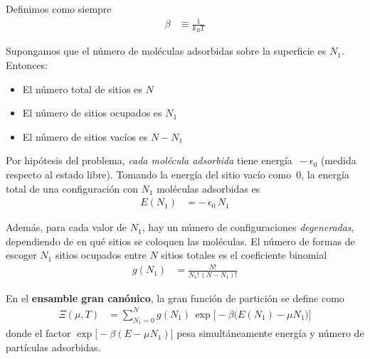 \documentclass{article}
\begin{document}
Definimos como siempre
\begin{equation}
\begin{split}
\beta &\equiv \frac{1}{k_{B}T}
\end{split}\label{eq:def_beta_gran}
\end{equation}

Supongamos que el número de moléculas adsorbidas sobre la superficie es $N_{1}$. Entonces:

\begin{itemize}
    \item[$\bullet$] El número total de sitios es $N$
    \item[$\bullet$] El número de sitios ocupados es $N_{1}$
    \item[$\bullet$] El número de sitios vacíos es $N - N_{1}$
\end{itemize}


Por hipótesis del problema, \emph{cada molécula adsorbida} tiene energía \(\,-\epsilon_{0}\) (medida respecto al estado libre).  
Tomando la energía del sitio vacío como \(\,0\), la energía total de una configuración con \(N_{1}\) moléculas adsorbidas es
\begin{equation}
\begin{split}
E(N_{1}) &= -\,\epsilon_{0}\,N_{1}
\end{split}\label{eq:energia_N1}
\end{equation}

Además, para cada valor de \(N_{1}\), hay un número de configuraciones \emph{degeneradas}, dependiendo de en qué sitios se coloquen las moléculas. El número de formas de escoger \(N_{1}\) sitios ocupados entre \(N\) sitios totales es el coeficiente binomial
\begin{equation}
\begin{split}
g(N_{1}) &= \frac{N!}{N_{1}!\,(N-N_{1})!}
\end{split}\label{eq:degeneracion_N1}
\end{equation}

En el \textcolor{Tarawera}{\textbf{ensamble gran canónico}}, la gran función de partición se define como
\begin{equation}
\begin{split}
\Xi(\mu,T)
&= \sum_{N_{1}=0}^{N} g(N_{1})\,
\exp\!\big[-\beta\big(E(N_{1}) - \mu N_{1}\big)\big]
\end{split}\label{eq:Xi_def_general}
\end{equation}
donde el factor \(\exp\!\big[-\beta(E-\mu N_{1})\big]\) pesa simultáneamente energía y número de partículas adsorbidas.
\end{document}
